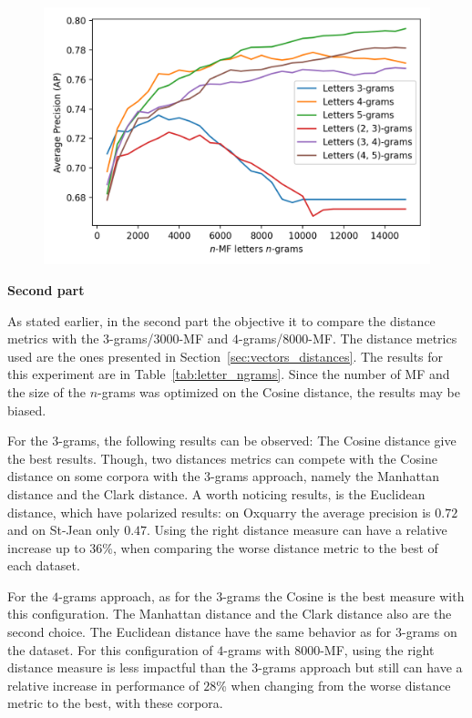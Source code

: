 \begin{figure}
  \label{fig:letter_ngrams_st_jean}
  \includegraphics[width=\linewidth]{img/letter_ngrams_st_jean.png}
\end{figure}

\textbf{Second part}

As stated earlier, in the second part the objective it to compare the distance metrics with the $3$-grams/$3000$-MF and $4$-grams/$8000$-MF.
The distance metrics used are the ones presented in Section~\ref{sec:vectors_distances}.
The results for this experiment are in Table~\ref{tab:letter_ngrams}.
Since the number of MF and the size of the $n$-grams was optimized on the Cosine distance, the results may be biased.

For the $3$-grams, the following results can be observed:
The Cosine distance give the best results.
Though, two distances metrics can compete with the Cosine distance on some corpora with the $3$-grams approach, namely the Manhattan distance and the Clark distance.
A worth noticing results, is the Euclidean distance, which have polarized results: on Oxquarry the average precision is $0.72$ and on St-Jean only $0.47$.
Using the right distance measure can have a relative increase up to $36$\%, when comparing the worse distance metric to the best of each dataset.

For the $4$-grams approach, as for the $3$-grams the Cosine is the best measure with this configuration.
The Manhattan distance and the Clark distance also are the second choice.
The Euclidean distance have the same behavior as for $3$-grams on the dataset.
For this configuration of $4$-grams with $8000$-MF, using the right distance measure is less impactful than the $3$-grams approach but still can have a relative increase in performance of $28$\% when changing from the worse distance metric to the best, with these corpora.

